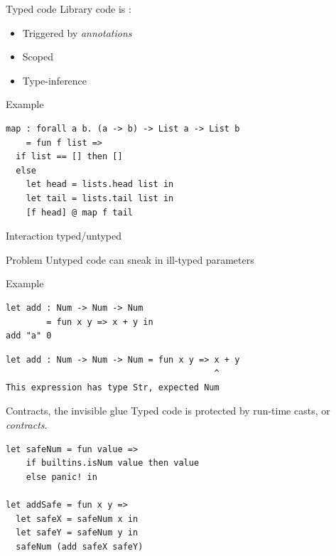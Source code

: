 \documentclass[aspectratio=169]{beamer}
\newcommand{\couleur}[2]{{\color{#1}{#2}}}
\begin{document}
\begin{frame}[fragile]{Typed code}
    Library code is \couleur{blue-portage}{statically typed}:
    \begin{itemize}
        \item Triggered by \emph{annotations}
        \item Scoped
        \item Type-inference
    \end{itemize}

\begin{exampleblock}{Example}
\begin{lstlisting}[language=Nickel,title={Statically typed map}]
map : forall a b. (a -> b) -> List a -> List b
    = fun f list =>
  if list == [] then []
  else
    let head = lists.head list in
    let tail = lists.tail list in
    [f head] @ map f tail
\end{lstlisting}
\end{exampleblock}
\end{frame}

\begin{frame}[fragile]{Interaction typed/untyped}

\begin{alertblock}{Problem}
Untyped code can sneak in ill-typed parameters
\end{alertblock}

\vspace{10pt}

\begin{exampleblock}{Example}
\begin{lstlisting}[language=Nickel]
let add : Num -> Num -> Num
        = fun x y => x + y in
add "a" 0
\end{lstlisting}

\begin{lstlisting}[language=Terminal,style=Terminal]
let add : Num -> Num -> Num = fun x y => x + y
                                         ^
This expression has type Str, expected Num
\end{lstlisting}
\end{exampleblock}
\end{frame}

\begin{frame}[fragile]{Contracts, the invisible glue}
Typed code is protected by run-time casts, or \emph{contracts}.

\vspace{10pt}

\begin{lstlisting}[language=Nickel,title={Generated code for \lstinline+add+
(simplified)}]
let safeNum = fun value =>
    if builtins.isNum value then value
    else panic! in

let addSafe = fun x y =>
  let safeX = safeNum x in
  let safeY = safeNum y in
  safeNum (add safeX safeY)
\end{lstlisting}
\end{frame}
\end{document}
